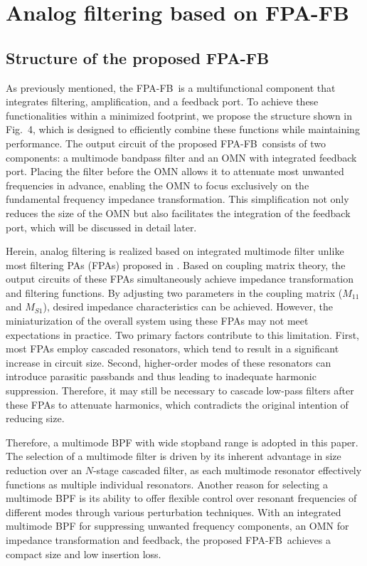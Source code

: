 \documentclass[twoside,twocolumn]{article}
\DeclareRobustCommand{\FPAFB}{FPA-FB}
\begin{document}
\section{Analog filtering based on FPA-FB}
\subsection{Structure of the proposed FPA-FB}


As previously mentioned, the \FPAFB\ is a multifunctional component that integrates filtering, amplification, and a feedback port. To achieve these functionalities within a minimized footprint, we propose the structure shown in Fig.~4, which is designed to efficiently combine these functions while maintaining performance. The output circuit of the proposed \FPAFB\ consists of two components: a multimode bandpass filter and an OMN with integrated feedback port.
Placing the filter before the OMN allows it to attenuate most unwanted frequencies in advance, enabling the OMN to focus exclusively on the fundamental frequency impedance transformation. This simplification not only reduces the size of the OMN but also facilitates the integration of the feedback port, which will be discussed in detail later.


Herein, analog filtering is realized based on integrated multimode filter unlike most filtering PAs (FPAs) proposed in \citep{FPA3,FPA1,FPA2,FPA6,FPA5,FPA4,FPA0}. Based on coupling matrix theory, the output circuits of these FPAs simultaneously achieve impedance transformation and filtering functions. By adjusting two parameters in the coupling matrix (\(M_{11}\) and \(M_{S1}\)), desired impedance characteristics can be achieved. However, the miniaturization of the overall system using these FPAs may not meet expectations in practice. Two primary factors contribute to this limitation. First, most FPAs employ cascaded resonators, which tend to result in a significant increase in circuit size. Second, higher-order modes of these resonators can introduce parasitic passbands and thus leading to inadequate harmonic suppression. Therefore, it may still be necessary to cascade low-pass filters after these FPAs to attenuate harmonics, which contradicts the original intention of reducing size. 


Therefore, a multimode BPF with wide stopband range is adopted in this paper. The selection of a multimode filter is driven by its inherent advantage in size reduction over an \(N\)-stage cascaded filter, as each multimode resonator effectively functions as multiple individual resonators. Another reason for selecting a multimode BPF is its ability to offer flexible control over resonant frequencies of different modes through various perturbation techniques. With an integrated multimode BPF for suppressing unwanted frequency components, an OMN for impedance transformation and feedback, the proposed \FPAFB\ achieves a compact size and low insertion loss.
\end{document}
